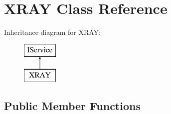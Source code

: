 \hypertarget{class_x_r_a_y}{}\section{X\+R\+AY Class Reference}
\label{class_x_r_a_y}
Inheritance diagram for X\+R\+AY\+:\begin{figure}[H]
\begin{center}
\leavevmode
\includegraphics[height=2.000000cm]{class_x_r_a_y}
\end{center}
\end{figure}
\subsection*{Public Member Functions}

